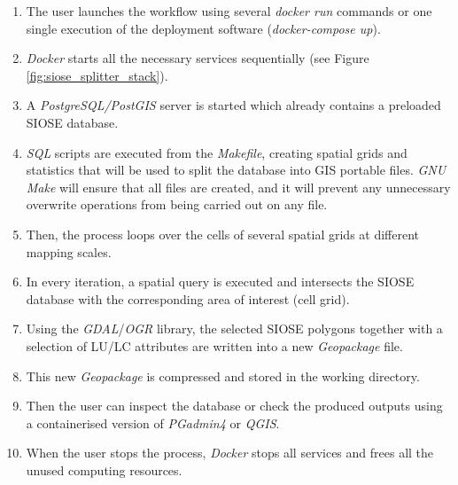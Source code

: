 \documentclass[ijgi,article,submit,moreauthors,pdftex]{Definitions/mdpi}
\begin{document}
\begin{enumerate}
    \item The user launches the workflow using several \textit{docker run} commands or one single execution of the deployment software (\textit{docker-compose up}).
    \item \textit{Docker} starts all the necessary services sequentially (see Figure \ref{fig:siose_splitter_stack}).
    \item A \textit{PostgreSQL/PostGIS} server is started which already contains a preloaded SIOSE database.
    \item \textit{SQL} scripts are executed from the \textit{Makefile}, creating spatial grids and statistics that will be used to split the database into GIS portable files. \textit{GNU Make} will ensure that all files are created, and it will prevent any unnecessary overwrite operations from being carried out on any file. 
    \item Then, the process loops over the cells of several spatial grids at different mapping scales.
    \item In every iteration, a spatial query is executed and intersects the SIOSE database with the corresponding area of interest (cell grid).
    \item Using the \textit{GDAL}/\textit{OGR} library, the selected SIOSE polygons together with a selection of LU/LC attributes are written into a new \textit{Geopackage} file. 
    \item This new \textit{Geopackage} is compressed and stored in the working directory.
    \item Then the user can inspect the database or check the produced outputs using a containerised version of \textit{PGadmin4} or \textit{QGIS}.
    \item When the user stops the process, \textit{Docker} stops all services and frees all the unused computing resources.
\end{enumerate}{}
\end{document}
